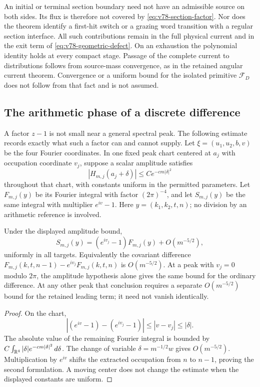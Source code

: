 \begin{remark}
\label{rem:v78-boundary-scope}
An initial or terminal section boundary need not have an admissible
source on both sides. Its flux is therefore not covered by
\eqref{eq:v78-section-factor}. Nor does the theorem identify a
first-hit switch or a grazing word transition with a regular section
interface. All such contributions remain in the full physical current
and in the exit term of \eqref{eq:v78-geometric-defect}.
On an exhaustion the polynomial identity holds at every compact
stage. Passage of the complete current to distributions follows
from source-mass convergence, as in the retained angular current
theorem. Convergence or a uniform bound for the isolated primitive
$\mathscr F_D$ does not follow from that fact and is not assumed.
\end{remark}

\subsection{The arithmetic phase of a discrete difference}
A factor $z-1$ is not small near a general spectral peak. The following
estimate records exactly what such a factor can and cannot supply.
Let $\xi=(u_1,u_2,b,v)$ be the four Fourier coordinates. In one
fixed peak chart centered at $a_j$ with occupation coordinate $v_j$,
suppose a scalar amplitude satisfies
\[
 |H_{m,j}(a_j+\delta)|\le C e^{-c m|\delta|^2}
\]
throughout that chart, with constants uniform in the permitted
parameters. Let $F_{m,j}(y)$ be its Fourier integral with factor
$(2\pi)^{-4}$, and let $S_{m,j}(y)$ be the same integral with
multiplier $e^{iv}-1$. Here $y=(k_1,k_2,t,n)$; no division by an
arithmetic reference is involved.

\begin{proposition}
\label{prop:v78-peak-difference}
Under the displayed amplitude bound,
\begin{equation}\label{eq:v78-peak-difference}
 S_{m,j}(y)=(e^{iv_j}-1)F_{m,j}(y)+O(m^{-5/2}),
\end{equation}
uniformly in all targets. Equivalently the covariant difference
$F_{m,j}(k,t,n-1)-e^{iv_j}F_{m,j}(k,t,n)$ is $O(m^{-5/2})$.
At a peak with $v_j=0$ modulo $2\pi$, the amplitude hypothesis
alone gives the same bound for the ordinary difference. At any
other peak that conclusion requires a separate $O(m^{-5/2})$
bound for the retained leading term; it need not vanish identically.
\end{proposition}
\begin{proof}
On the chart,
\[
 |(e^{iv}-1)-(e^{iv_j}-1)|\le|v-v_j|\le|\delta|.
\]
The absolute value of the remaining Fourier integral is bounded by
$C\int_{\mathbb R^4}|\delta|e^{-cm|\delta|^2}\,d\delta$.
The change of variable $\delta=m^{-1/2}w$ gives $O(m^{-5/2})$.
Multiplication by $e^{iv}$ shifts the extracted occupation from $n$
to $n-1$, proving the second formulation. A moving center does not
change the estimate when the displayed constants are uniform.
\end{proof}

